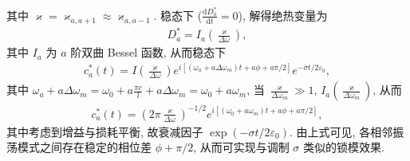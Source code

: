 \documentclass[twoside]{note}
\begin{document}
\begin{sol}
\begin{align}
    \end{align}
    其中 $\varkappa=\varkappa_{a,a+1}\approx\varkappa_{a,a-1}$.
    稳态下 ($\frac{\mathrm{d}D_a^*}{\mathrm{d}t}=0$), 解得绝热变量为
    \begin{align}
        D_a^*=I_a\left(\frac{\varkappa}{\Delta\omega}\right),
    \end{align}
    其中 $I_a$ 为 $a$ 阶双曲 Bessel 函数, 从而稳态下
    \begin{align}
        c_a^*(t)=I\left(\frac{\varkappa}{\Delta\omega}\right)e^{i[(\omega_a+a\Delta\omega_m)t+a\phi+a\pi/2]}e^{-\sigma t/2\varepsilon_0},
    \end{align}
    其中 $\omega_a+a\Delta\omega_m=\omega_0+a\frac{\pi c}{l}+a\Delta\omega_m=\omega_0+a\omega_m$, 当 $\frac{\varkappa}{\Delta\omega_m}\gg 1$, $I_a\left(\frac{\varkappa}{\Delta\omega_m}\right)$, 从而
    \begin{align}
        c_a^*(t)=\left(2\pi\frac{\varkappa}{\Delta\omega}\right)^{-1/2}e^{i[(\omega_0+a\omega_m)t+a\phi+a\pi/2]},
    \end{align}
    其中考虑到增益与损耗平衡, 故衰减因子 $\exp(-\sigma t/2\varepsilon_0)$.
    由上式可见, 各相邻振荡模式之间存在稳定的相位差 $\phi+\pi/2$, 从而可实现与调制 $\sigma$ 类似的锁模效果.
\end{sol}
\ifx\allfiles\undefined
\end{document}
